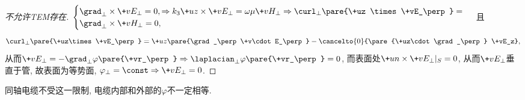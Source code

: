 \documentclass[hidelinks]{ctexart}
\begin{document}
\begin{proof}[不允许TEM存在]
    $\begin{cases}
        \grad_\perp \times \+vE_\perp = 0, \Rightarrow k_3\+uz \times \+vE_\perp = \omega\mu \+vH_\perp \Rightarrow \curl_\perp\pare{\+uz \times \+vE_\perp} =  \\
        \grad_\perp \times \+vH_\perp = 0,
    \end{cases}$ 且
    \[ \curl_\perp \pare{\+uz\times \+vE_\perp} = \+uz\pare{\grad_\perp\+v\cdot E_\perp} - \cancelto{0}{\pare{\+uz\cdot \grad_\perp} \+vE_z}, \]
    从而$\+vE_\perp = -\grad_\perp \varphi\pare{\+vr_\perp} \Rightarrow \laplacian_\perp \varphi\pare{\+vr_\perp} = 0$, 而表面处$\+un \times \+vE_\perp\vert_{S}  = 0$, 从而$\+vE_\perp$垂直于管, 故表面为等势面, $\varphi_\perp = \const \Rightarrow \+vE_\perp = 0$.
\end{proof}
\begin{remark}
    同轴电缆不受这一限制, 电缆内部和外部的$\varphi$不一定相等.
\end{remark}
\end{document}
